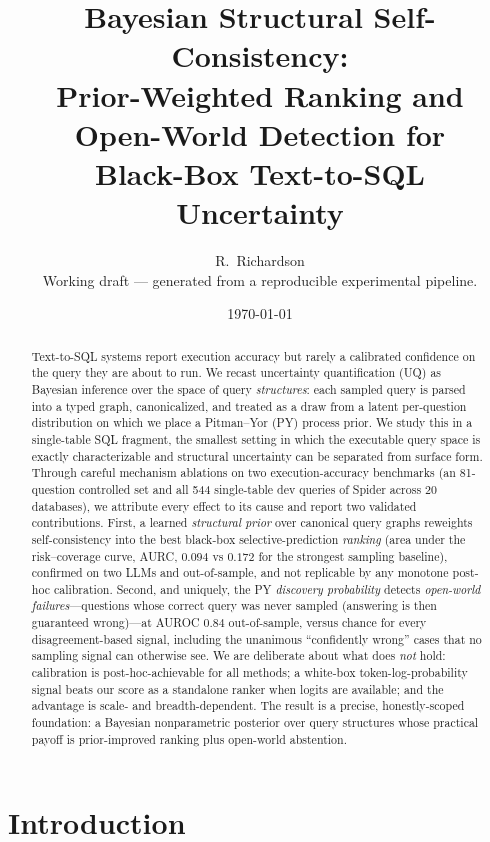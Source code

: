 \documentclass[11pt]{article}
\title{\bfseries Bayesian Structural Self-Consistency:\\
Prior-Weighted Ranking and Open-World Detection for\\
Black-Box Text-to-SQL Uncertainty}
\author{%
  R.\ Richardson\\
  \small Working draft --- generated from a reproducible experimental pipeline.
}
\date{\today}
\begin{document}
\maketitle

\begin{abstract}
Text-to-SQL systems report execution accuracy but rarely a calibrated confidence on the query
they are about to run. We recast uncertainty quantification (UQ) as Bayesian inference over the
space of query \emph{structures}: each sampled query is parsed into a typed graph,
canonicalized, and treated as a draw from a latent per-question distribution on which we place a
Pitman--Yor (PY) process prior. We study this in a single-table SQL fragment, the smallest setting
in which the executable query space is exactly characterizable and structural uncertainty can be
separated from surface form. Through careful mechanism ablations on two execution-accuracy
benchmarks (an 81-question controlled set and all 544 single-table dev queries of Spider across
20 databases), we attribute every effect to its cause and report two validated contributions.
First, a learned \emph{structural prior} over canonical query graphs reweights self-consistency
into the best black-box selective-prediction \emph{ranking} (area under the risk--coverage curve,
AURC, $0.094$ vs $0.172$ for the strongest sampling baseline), confirmed on two LLMs and
out-of-sample, and not replicable by any monotone post-hoc calibration. Second, and uniquely, the
PY \emph{discovery probability} detects \emph{open-world failures}---questions whose correct query
was never sampled (answering is then guaranteed wrong)---at AUROC $0.84$ out-of-sample, versus
chance for every disagreement-based signal, including the unanimous ``confidently wrong'' cases
that no sampling signal can otherwise see. We are deliberate about what does \emph{not} hold:
calibration is post-hoc-achievable for all methods; a white-box token-log-probability signal beats
our score as a standalone ranker when logits are available; and the advantage is scale- and
breadth-dependent. The result is a precise, honestly-scoped foundation: a Bayesian nonparametric
posterior over query structures whose practical payoff is prior-improved ranking plus open-world
abstention.
\end{abstract}

\section{Introduction}
\end{document}
